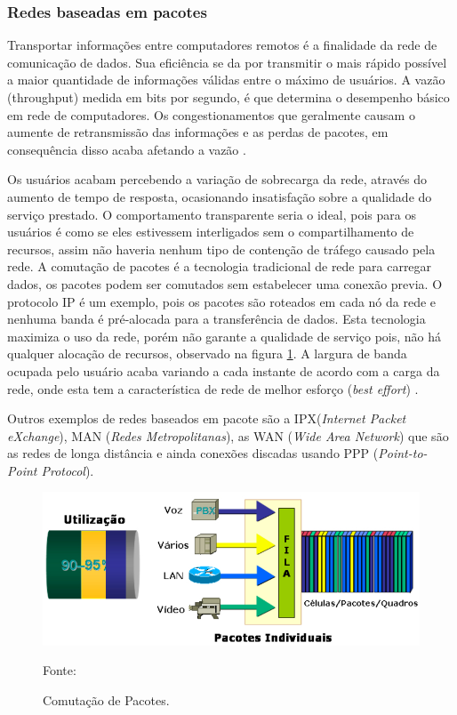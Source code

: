 \subsubsection{Redes baseadas em pacotes}
Transportar informações entre computadores remotos é a finalidade da rede de comunicação de dados. Sua eficiência se da por transmitir o mais rápido possível a maior quantidade de informações válidas entre o máximo de usuários. A vazão (throughput) medida em bits por segundo, é que determina o desempenho básico em rede de computadores. Os congestionamentos que geralmente causam o aumente de retransmissão das informações e as perdas de pacotes, em consequência disso acaba afetando a vazão \cite{davidson2008}.

Os usuários acabam percebendo a variação de sobrecarga da rede, através do aumento de tempo de resposta, ocasionando insatisfação sobre a qualidade do serviço prestado. O comportamento transparente seria o ideal, pois para os usuários é como se eles estivessem interligados sem o compartilhamento de recursos, assim não haveria nenhum tipo de contenção de tráfego causado pela rede. A comutação de pacotes é a tecnologia tradicional de rede para carregar dados, os pacotes podem ser comutados sem estabelecer uma conexão previa. O protocolo IP é um exemplo, pois os pacotes são roteados em cada nó da rede e nenhuma banda é pré-alocada para a transferência de dados. Esta tecnologia maximiza o uso da rede, porém não garante a qualidade de serviço pois, não há qualquer alocação de recursos, observado na figura \ref{Figura8}. A largura de banda ocupada pelo usuário acaba variando a cada instante de acordo com a carga da rede, onde esta tem a característica de rede de melhor esforço (\textit{best
effort}) \cite{adrianoramosgoncalves2001}.

Outros exemplos de redes baseados em pacote são a IPX(\textit{Internet Packet eXchange}), MAN (\textit{Redes Metropolitanas}), as WAN (\textit{Wide Area Network}) que são as redes de longa distância e ainda conexões discadas usando PPP (\textit{Point-to-Point Protocol}).

\begin{figure}[h]
	\centering
	\includegraphics[width=16.0cm]{imagens/comutacaoPacotes1.jpg}
	\caption{Comutação de Pacotes.}
    \label{Figura8}
    Fonte: \cite{eduardomaronasmonks2006}
\end{figure}


